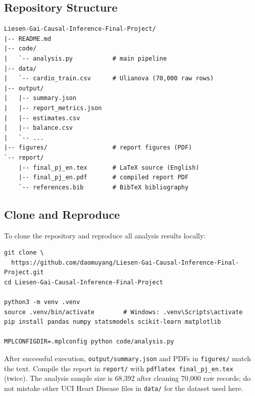 \documentclass[12pt,a4paper]{article}
\begin{document}
\subsection{Repository Structure}

\begin{verbatim}
Liesen-Gai-Causal-Inference-Final-Project/
|-- README.md
|-- code/
|   `-- analysis.py           # main pipeline
|-- data/
|   `-- cardio_train.csv      # Ulianova (70,000 raw rows)
|-- output/
|   |-- summary.json
|   |-- report_metrics.json
|   |-- estimates.csv
|   |-- balance.csv
|   `-- ...
|-- figures/                  # report figures (PDF)
`-- report/
    |-- final_pj_en.tex       # LaTeX source (English)
    |-- final_pj_en.pdf       # compiled report PDF
    `-- references.bib        # BibTeX bibliography
\end{verbatim}

\subsection{Clone and Reproduce}

To clone the repository and reproduce all analysis results locally:
\begin{verbatim}
git clone \
  https://github.com/daomuyang/Liesen-Gai-Causal-Inference-Final-Project.git
cd Liesen-Gai-Causal-Inference-Final-Project

python3 -m venv .venv
source .venv/bin/activate        # Windows: .venv\Scripts\activate
pip install pandas numpy statsmodels scikit-learn matplotlib

MPLCONFIGDIR=.mplconfig python code/analysis.py
\end{verbatim}

After successful execution, \texttt{output/summary.json} and PDFs in \texttt{figures/} match the text. Compile the report in \texttt{report/} with \texttt{pdflatex final\_pj\_en.tex} (twice). The analysis sample size is 68{,}392 after cleaning 70{,}000 raw records; do not mistake other UCI Heart Disease files in \texttt{data/} for the dataset used here.
\end{document}
